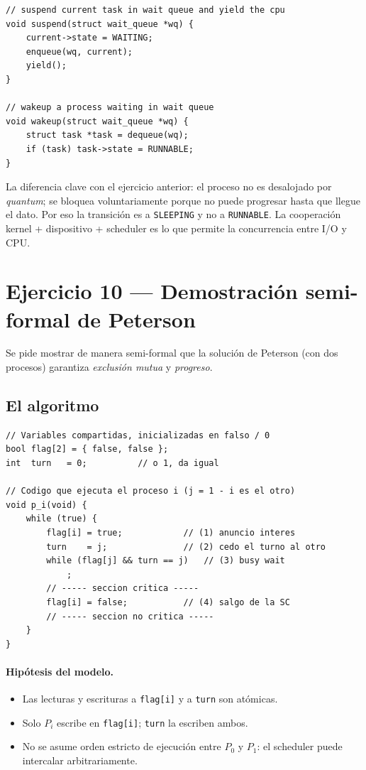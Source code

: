 \documentclass[11pt,a4paper]{article}
\begin{document}
\begin{lstlisting}[style=cstyle]
// suspend current task in wait queue and yield the cpu
void suspend(struct wait_queue *wq) {
    current->state = WAITING;
    enqueue(wq, current);
    yield();
}

// wakeup a process waiting in wait queue
void wakeup(struct wait_queue *wq) {
    struct task *task = dequeue(wq);
    if (task) task->state = RUNNABLE;
}
\end{lstlisting}

La diferencia clave con el ejercicio anterior: el proceso no es
desalojado por \emph{quantum}; se bloquea voluntariamente porque no
puede progresar hasta que llegue el dato. Por eso la transición es a
\texttt{SLEEPING} y no a \texttt{RUNNABLE}. La cooperación
kernel + dispositivo + scheduler es lo que permite la concurrencia
entre I/O y CPU.

\section{Ejercicio 10 --- Demostración semi-formal de Peterson}

Se pide mostrar de manera semi-formal que la solución de Peterson
(con dos procesos) garantiza \emph{exclusión mutua} y \emph{progreso}.

\subsection*{El algoritmo}

\begin{lstlisting}[style=cstyle]
// Variables compartidas, inicializadas en falso / 0
bool flag[2] = { false, false };
int  turn   = 0;          // o 1, da igual

// Codigo que ejecuta el proceso i (j = 1 - i es el otro)
void p_i(void) {
    while (true) {
        flag[i] = true;            // (1) anuncio interes
        turn    = j;               // (2) cedo el turno al otro
        while (flag[j] && turn == j)   // (3) busy wait
            ;
        // ----- seccion critica -----
        flag[i] = false;           // (4) salgo de la SC
        // ----- seccion no critica -----
    }
}
\end{lstlisting}

\paragraph{Hipótesis del modelo.}
\begin{itemize}[leftmargin=*,nosep]
    \item Las lecturas y escrituras a \texttt{flag[i]} y a \texttt{turn}
        son atómicas.
    \item Solo $P_i$ escribe en \texttt{flag[i]}; \texttt{turn} la
        escriben ambos.
    \item No se asume orden estricto de ejecución entre $P_0$ y $P_1$:
        el scheduler puede intercalar arbitrariamente.
\end{itemize}
\end{document}
